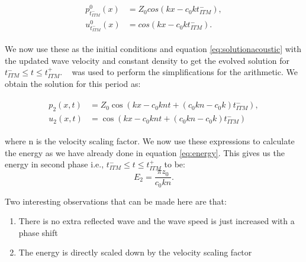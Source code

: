 \begin{align}
    \begin{split}
        p^0_{t_{ITM}^-}\left(x\right) &= Z_0 cos\left(kx - c_0kt_{ITM}^-\right), \\
        u^0_{t_{ITM}^-}\left(x\right) &= cos\left(kx - c_0kt_{ITM}^-\right) .
    \end{split}
\end{align}

We now use these as the initial conditions and equation \ref{eq:solutionacoustic} with the updated wave velocity and constant density to get the evolved solution for $t_{ITM}^- \leq t \leq t_{ITM}^+ $. ~\parencite{sagemath} was used to perform the simplifications for the arithmetic. We obtain the solution for this period as:

\begin{align}
    \begin{split}
        p_{2}\left(x, t\right) &= Z_{0} \cos\left(kx -c_{0} k n t + {\left(c_{0} k n - c_{0} k\right)} \mathit{t_{ITM}^-}\right), \\
        u_{2}\left(x, t\right) &= \cos\left(kx -c_{0} k n t + {\left(c_{0} k n - c_{0} k\right)} \mathit{t_{ITM}^-} \right)
    \end{split}
\end{align}

where n is the velocity scaling factor. We now use these expressions to calculate the energy as we have already done in equation \ref{eq:energy}. This gives us the energy in second phase i.e., $t_{ITM}^- \leq t \leq t_{ITM}^+ $ to be:
\begin{equation}
    E_2 = \frac{\pi z_{0}}{c_{0} k n} .
\end{equation}

Two interesting observations that can be made here are that:
\begin{enumerate}
    \item There is no extra reflected wave and the wave speed is just increased with a phase shift
    \item The energy is directly scaled down by the velocity scaling factor
\end{enumerate}


